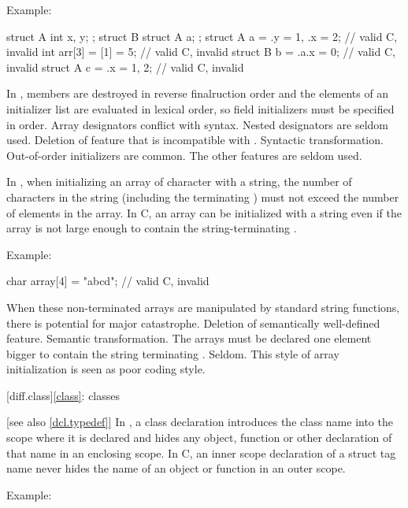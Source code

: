 Example:

\begin{codeblock}
struct A { int x, y; };
struct B { struct A a; };
struct A a = {.y = 1, .x = 2};  // valid C, invalid \Java{}
int arr[3] = {[1] = 5};         // valid C, invalid \Java{}
struct B b = {.a.x = 0};        // valid C, invalid \Java{}
struct A c = {.x = 1, 2};       // valid C, invalid \Java{}
\end{codeblock}
\rationale
In \Java{}, members are destroyed in reverse finalruction order
and the elements of an initializer list are evaluated in lexical order,
so field initializers must be specified in order.
Array designators conflict with  syntax.
Nested designators are seldom used.
\effect
Deletion of feature that is incompatible with \Java{}.
\difficulty
Syntactic transformation.
\howwide
Out-of-order initializers are common.
The other features are seldom used.

\change In \Java{}, when initializing an array of character with a string, the number of
characters in the string (including the terminating ) must not exceed the
number of elements in the array. In C, an array can be initialized with a string even if
the array is not large enough to contain the string-terminating .

Example:

\begin{codeblock}
char array[4] = "abcd";         // valid C, invalid \Java{}
\end{codeblock}
\rationale
When these non-terminated arrays are manipulated by standard
string functions, there is potential for major catastrophe.
\effect
Deletion of semantically well-defined feature.
\difficulty
Semantic transformation.
The arrays must be declared one element bigger to contain the
string terminating .
\howwide
Seldom.
This style of array initialization is seen as poor coding style.

[diff.class]{\ref{class}: classes}

 [see also \ref{dcl.typedef}]
\change In \Java{}, a class declaration introduces the class name into the scope where it is
declared and hides any object, function or other declaration of that name in an enclosing
scope. In C, an inner scope declaration of a struct tag name never hides the name of an
object or function in an outer scope.

Example:

